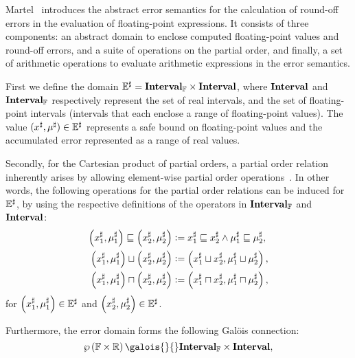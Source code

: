 Martel~\cite{martel07} introduces the abstract error semantics for the
calculation of round-off errors in the evaluation of floating-point
expressions.  It consists of three components: an abstract domain to enclose
computed floating-point values and round-off errors, and a suite of operations
on the partial order, and finally, a set of arithmetic operations to evaluate
arithmetic expressions in the error semantics.

First we define the domain $\mathbb{E}^\sharp = \mathbf{Interval}_\mathbb{F}\times\mathbf{Interval}$,
where $\mathbf{Interval}$ and $\mathbf{Interval}_\mathbb{F}$ respectively represent the
set of real intervals, and the set of floating-point intervals (intervals
that each enclose a range of floating-point values).  The value $(x^\sharp,
\mu^\sharp) \in \mathbb{E}^\sharp$ represents a safe bound on floating-point
values and the accumulated error represented as a range of real values.

Secondly, for the Cartesian product of partial orders, a partial order
relation inherently arises by allowing element-wise partial order
operations~\cite{abramsky94}.  In other words, the following operations for the
partial order relations can be induced for $\mathbb{E}^\sharp$, by using the respective
definitions of the operators in $\mathbf{Interval}_\mathbb{F}$ and $\mathbf{Interval}$:
\begin{equation}
    \begin{aligned}
        \left( x^\sharp_1, \mu^\sharp_1 \right) \sqsubseteq
        \left( x^\sharp_2, \mu^\sharp_2 \right)
        &\vcentcolon=
            x^\sharp_1 \sqsubseteq x^\sharp_2 \wedge
            \mu^\sharp_1 \sqsubseteq \mu^\sharp_2, \\
        \left( x^\sharp_1, \mu^\sharp_1 \right) \sqcup
        \left( x^\sharp_2, \mu^\sharp_2 \right)
        &\vcentcolon=
            \left( x^\sharp_1 \sqcup x^\sharp_2,
              \mu^\sharp_1 \sqcup \mu^\sharp_2 \right), \\
        \left( x^\sharp_1, \mu^\sharp_1 \right) \sqcap
        \left( x^\sharp_2, \mu^\sharp_2 \right)
        &\vcentcolon=
            \left( x^\sharp_1 \sqcap x^\sharp_2,
              \mu^\sharp_1 \sqcap \mu^\sharp_2 \right),
    \end{aligned}
\end{equation}
for $\left( x^\sharp_1, \mu^\sharp_1 \right) \in \mathbb{E}^\sharp$ and
$\left( x^\sharp_2, \mu^\sharp_2 \right) \in \mathbb{E}^\sharp$.

Furthermore, the error domain forms the following Gal\"ois connection:
\begin{equation}
    \powersetof{\floatset\times\realset}
    \galois{}{}
    \floatintervalset\times\intervalset,
\end{equation}

